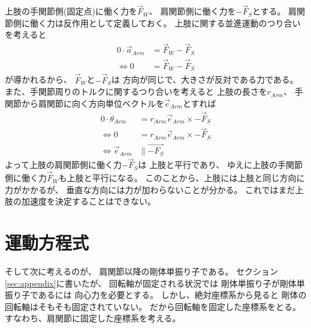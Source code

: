 \documentclass[a4paper,11pt]{jsarticle}
\begin{document}
上肢の手関節側(固定点)に働く力を$\vec{F}_W$、
肩関節側に働く力を$-\vec{F}_S$とする。
肩関節側に働く力は反作用として定義しておく。
上肢に関する並進運動のつり合いを考えると
\begin{align*}
  0 \cdot \vec{a}_{Arm} &= \vec{F}_W - \vec{F}_S
  \\
  \Leftrightarrow
  0 &= \vec{F}_W - \vec{F}_S
\end{align*}
が導かれるから、
$\vec{F}_W$と$-\vec{F}_S$は
方向が同じで、大きさが反対である力である。
また、手関節周りのトルクに関するつり合いを考えると
上肢の長さを$r_{Arm}$、
手関節から肩関節に向く方向単位ベクトルを$\vec{e}_{Arm}$とすれば
\begin{align*}
  0 \cdot \dot\theta_{Arm} &= r_{Arm} \vec{e}_{Arm} \times -\vec{F}_S
  \\
  \Leftrightarrow
  0 &= r_{Arm} \vec{e}_{Arm} \times -\vec{F}_S
  \\
  \Leftrightarrow
  \vec{e}_{Arm} &\parallel \vec{-F_S}
\end{align*}
よって上肢の肩関節側に働く力$-\vec{F}_S$は
上肢と平行であり、
ゆえに上肢の手関節側に働く力$\vec{F}_W$も上肢と平行になる。
このことから、上肢には上肢と同じ方向に力がかかるが、
垂直な方向には力が加わらないことが分かる。
これではまだ上肢の加速度を決定することはできない。

\section{運動方程式}

そして次に考えるのが、
肩関節以降の剛体単振り子である。
セクション\ref{sec:appendix}に書いたが、
回転軸が固定される状況では
剛体単振り子が剛体単振り子であるには
向心力を必要とする。
しかし、絶対座標系から見ると
剛体の回転軸はそもそも固定されていない。
だから回転軸を固定した座標系をとる。
すなわち、肩関節に固定した座標系を考える。
\end{document}
